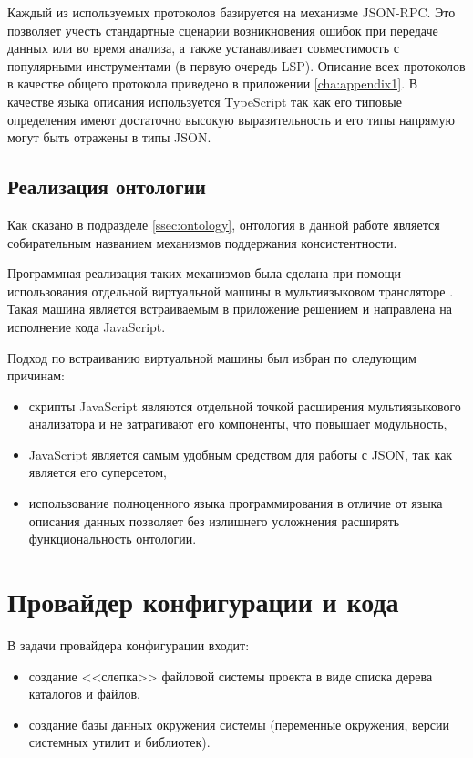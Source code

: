 Каждый из используемых протоколов базируется на механизме JSON-RPC. Это позволяет учесть стандартные
сценарии возникновения ошибок при передаче данных или во время анализа, а также устанавливает
совместимость с популярными инструментами (в первую очередь LSP). Описание всех протоколов
в качестве общего протокола приведено в приложении \ref{cha:appendix1}.
В качестве языка описания используется TypeScript так как
его типовые определения имеют достаточно высокую выразительность и его типы напрямую могут быть отражены в типы JSON.

\subsection{Реализация онтологии}

Как сказано в подразделе \ref{ssec:ontology}, онтология в данной работе является собирательным названием
механизмов поддержания консистентности.

Программная реализация таких механизмов была сделана при помощи использования отдельной виртуальной машины
в мультиязыковом трансляторе \cite{goja}. Такая машина является встраиваемым в приложение решением и
направлена на исполнение кода JavaScript.

Подход по встраиванию виртуальной машины был избран по следующим причинам:
\begin{itemize}
    \item скрипты JavaScript являются отдельной точкой расширения мультиязыкового анализатора и не затрагивают его компоненты, что повышает
    модульность,
    \item JavaScript является самым удобным средством для работы с JSON, так как является его суперсетом,
    \item использование полноценного языка программирования в отличие от языка описания данных позволяет
    без излишнего усложнения расширять функциональность онтологии.
\end{itemize}

\section{Провайдер конфигурации и кода}

В задачи провайдера конфигурации входит:
\begin{itemize}
    \item создание <<слепка>> файловой системы проекта в виде списка дерева каталогов и файлов,
    \item создание базы данных окружения системы (переменные окружения, версии системных утилит и библиотек).
\end{itemize}

